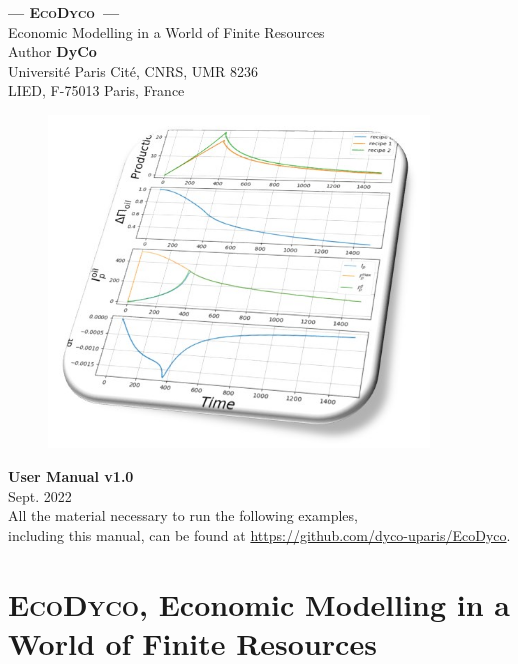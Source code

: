 \documentclass[12pt,a4paper]{article}%
\date{}
\newcommand{\ed}{\textsc{EcoDyco}}
\begin{document}
\begin{titlepage}

	\centering
		{\Huge \textbf{--- \ed\ ---} \\[0pt]}
		{\Large Economic Modelling in a World of Finite Resources \\[1cm]}
		\Large Author \textbf{DyCo} \\ 
		\large Universit\'e Paris Cit\'e, CNRS, UMR 8236 \\
		 LIED, F-75013 Paris, France
		\vspace{1cm}

		\begin{figure}[h]
			\centering \includegraphics[width=0.9\textwidth]{figures/couverture.jpg}
		\end{figure}
	
		\vspace{1cm}
		{\Huge \textbf{User Manual v1.0} \\[0.5cm]}
		{\Large Sept. 2022 \\[0.5cm]}
		{\large All the material necessary to run the following examples,\\ including this manual, can be found at \url{https://github.com/dyco-uparis/EcoDyco}. 
		}

\end{titlepage}
\restoregeometry

\tableofcontents
\setcounter{page}{1}

\newpage


\section{\ed, Economic Modelling in a World of Finite Resources}
\end{document}
